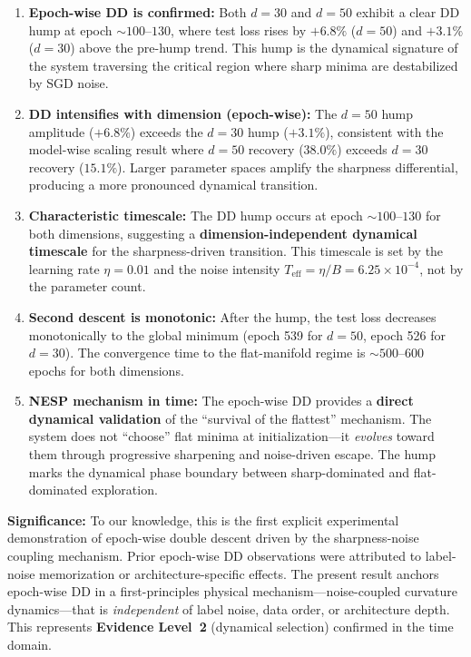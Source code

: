 \documentclass[
  journal=largetwo,
  simfonts=false,
  year=2025,
  volume=37,
]{cup-journal}
\begin{document}
\begin{enumerate}
    \item \textbf{Epoch-wise DD is confirmed:} Both $d=30$ and $d=50$ exhibit a clear DD hump at epoch $\sim 100$--$130$, where test loss rises by $+6.8\%$ ($d=50$) and $+3.1\%$ ($d=30$) above the pre-hump trend. This hump is the dynamical signature of the system traversing the critical region where sharp minima are destabilized by SGD noise.
    
    \item \textbf{DD intensifies with dimension (epoch-wise):} The $d=50$ hump amplitude ($+6.8\%$) exceeds the $d=30$ hump ($+3.1\%$), consistent with the model-wise scaling result where $d=50$ recovery ($38.0\%$) exceeds $d=30$ recovery ($15.1\%$). Larger parameter spaces amplify the sharpness differential, producing a more pronounced dynamical transition.
    
    \item \textbf{Characteristic timescale:} The DD hump occurs at epoch $\sim 100$--$130$ for both dimensions, suggesting a \textbf{dimension-independent dynamical timescale} for the sharpness-driven transition. This timescale is set by the learning rate $\eta=0.01$ and the noise intensity $T_{\mathrm{eff}} = \eta/B = 6.25 \times 10^{-4}$, not by the parameter count.
    
    \item \textbf{Second descent is monotonic:} After the hump, the test loss decreases monotonically to the global minimum (epoch 539 for $d=50$, epoch 526 for $d=30$). The convergence time to the flat-manifold regime is $\sim 500$--$600$ epochs for both dimensions.
    
    \item \textbf{NESP mechanism in time:} The epoch-wise DD provides a \textbf{direct dynamical validation} of the ``survival of the flattest'' mechanism. The system does not ``choose'' flat minima at initialization---it \emph{evolves} toward them through progressive sharpening and noise-driven escape. The hump marks the dynamical phase boundary between sharp-dominated and flat-dominated exploration.
\end{enumerate}

\textbf{Significance:} To our knowledge, this is the first explicit experimental demonstration of epoch-wise double descent driven by the sharpness-noise coupling mechanism. Prior epoch-wise DD observations \cite{nakkiran_deep_2019} were attributed to label-noise memorization or architecture-specific effects. The present result anchors epoch-wise DD in a first-principles physical mechanism---noise-coupled curvature dynamics---that is \emph{independent} of label noise, data order, or architecture depth. This represents \textbf{Evidence Level~2} (dynamical selection) confirmed in the time domain.
\end{document}
